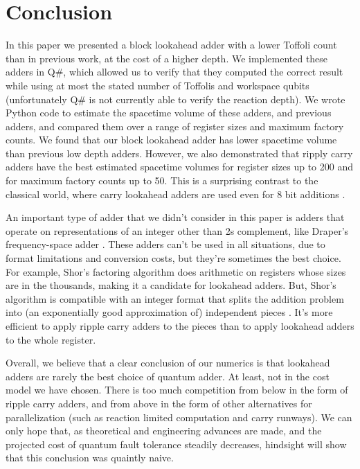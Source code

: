 \documentclass[onecolumn,unpublished]{quantumarticle}
\theoremstyle{definition}
\theoremstyle{definition}
\theoremstyle{definition}
\begin{document}
\section{Conclusion}
\label{sec:conclusion}

In this paper we presented a block lookahead adder with a lower Toffoli count than in previous work, at the cost of a higher depth.
We implemented these adders in Q\#, which allowed us to verify that they computed the correct result while using at most the stated number of Toffolis and workspace qubits (unfortunately Q\# is not currently able to verify the reaction depth).
We wrote Python code to estimate the spacetime volume of these adders, and previous adders, and compared them over a range of register sizes and maximum factory counts.
We found that our block lookahead adder has lower spacetime volume than previous low depth adders.
However, we also demonstrated that ripply carry adders have the best estimated spacetime volumes for register sizes up to 200 and for maximum factory counts up to 50.
This is a surprising contrast to the classical world, where carry lookahead adders are used even for 8 bit additions \cite{shirriff2020reverseengineer8008}.

An important type of adder that we didn't consider in this paper is adders that operate on representations of an integer other than 2s complement, like Draper's frequency-space adder \cite{draper2000qftaddition}.
These adders can't be used in all situations, due to format limitations and conversion costs, but they're sometimes the best choice.
For example, Shor's factoring algorithm \cite{shor1994algorithms} does arithmetic on registers whose sizes are in the thousands, making it a candidate for lookahead adders.
But, Shor's algorithm is compatible with an integer format that splits the addition problem into (an exponentially good approximation of) independent pieces \cite{gidney2019approximate,gidney2019factor}.
It's more efficient to apply ripple carry adders to the pieces than to apply lookahead adders to the whole register.

Overall, we believe that a clear conclusion of our numerics is that lookahead adders are rarely the best choice of quantum adder.
At least, not in the cost model we have chosen.
There is too much competition from below in the form of ripple carry adders, and from above in the form of other alternatives for parallelization (such as reaction limited computation and carry runways).
We can only hope that, as theoretical and engineering advances are made, and the projected cost of quantum fault tolerance steadily decreases, hindsight will show that this conclusion was quaintly naive.
\end{document}
